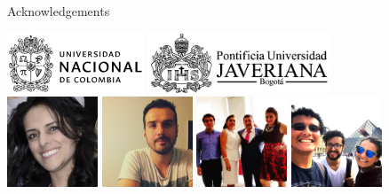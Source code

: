 \documentclass[11pt]{beamer}
\begin{document}
\begin{frame}{Acknowledgements}
\begin{center}
\includegraphics[height=1.8cm]{UN}\hspace{0.5cm}
\includegraphics[height=1.8cm]{Javeriana}\vspace{0.5cm}\\
\includegraphics[width=2.7cm]{Janneth}
\includegraphics[width=2.7cm]{Andres}
\includegraphics[width=2.7cm]{Familia}
\includegraphics[width=2.7cm]{Kelly-Juan-Daniel}\\
\end{center}
\end{frame}
\end{document}
